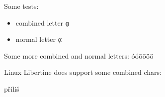 \documentclass{article}
\begin{document}
Some tests:
\begin{itemize}
  \item combined letter ᾳ %
  \item normal letter ᾳ%
\end{itemize}

Some more combined and normal letters: 
óóōōöö

Linux Libertine does support some combined chars: \parbox{4em}{příliš}
\end{document}
